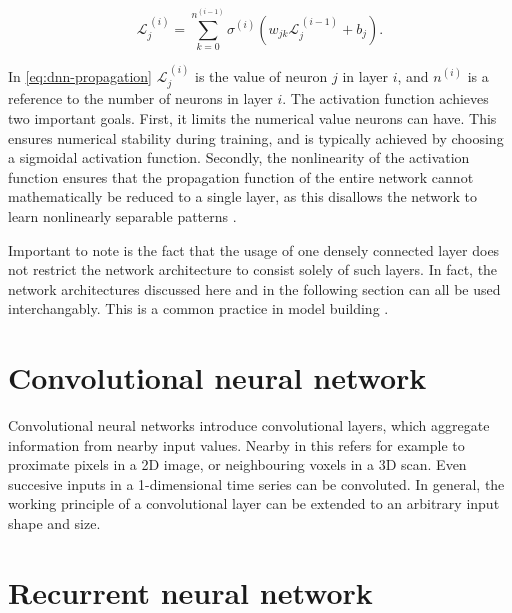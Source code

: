 \begin{equation}
\label{eq:dnn-propagation}
\mathcal{L}_j^{\,(i)} = \sum\limits_{k = 0}^{n^{(i-1)}} \sigma^{(i)}\left( w_{jk} \mathcal{L}_j^{\,(i-1)} + b_j\right).
\end{equation}

In \autoref{eq:dnn-propagation} $\mathcal{L}_j^{\,(i)}$ is the value of neuron $j$ in layer $i$, and $n^{(i)}$ is a reference to the number of neurons in 
layer $i$. The activation function achieves two important goals. First, it limits the numerical value neurons can have. This ensures numerical stability
during training, and is typically achieved by choosing a sigmoidal activation function. Secondly, the nonlinearity of the activation function ensures that 
the propagation function of the entire network cannot mathematically be reduced to a single layer, as this disallows the network to learn nonlinearly 
separable patterns \cite{russell2010artificial}. 

Important to note is the fact that the usage of one densely connected layer does not restrict the network architecture to consist solely of such layers. 
In fact, the network architectures discussed here and in the following section can all be used interchangably. This is a common practice in model building
\cite{szegedy2015going, krizhevsky2017imagenet}.


\section{Convolutional neural network}
\label{sec:CNN}

Convolutional neural networks introduce convolutional layers, which aggregate information from nearby input values. Nearby in this refers for example to 
proximate pixels in a 2D image, or neighbouring voxels in a 3D scan. Even succesive inputs in a 1-dimensional time series can be convoluted. In general, the
working principle of a convolutional layer can be extended to an arbitrary input shape and size. 

\section{Recurrent neural network}
\label{sec:RNN}